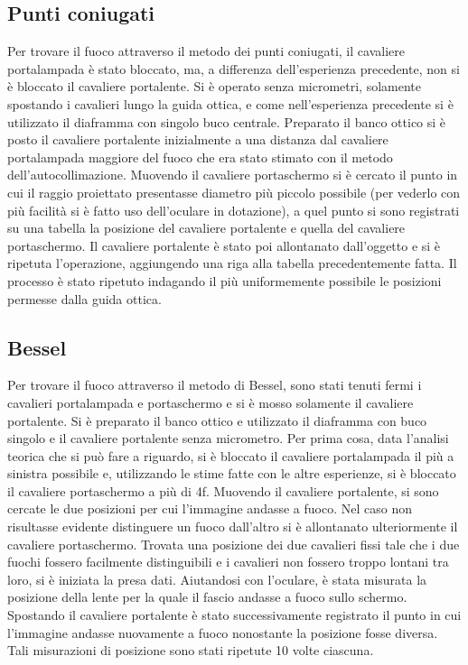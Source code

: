 \subsection{Punti coniugati} 
Per trovare il fuoco attraverso il metodo dei punti coniugati, il 
cavaliere portalampada \`e stato bloccato, ma, a differenza dell'esperienza 
precedente, non si è bloccato il cavaliere portalente. Si è 
operato senza micrometri, solamente spostando i cavalieri lungo la 
guida ottica, e come nell'esperienza precedente si è utilizzato il 
diaframma con singolo buco centrale. Preparato il banco ottico si è 
posto il cavaliere portalente inizialmente a una distanza dal 
cavaliere portalampada maggiore del fuoco che era stato stimato con 
il metodo dell'autocollimazione. Muovendo il cavaliere portaschermo 
si è cercato il punto in cui il raggio proiettato presentasse 
diametro più piccolo possibile (per vederlo con più facilità si è 
fatto uso dell'oculare in dotazione), a quel punto si sono 
registrati su una tabella la posizione del cavaliere portalente e 
quella del cavaliere portaschermo. Il cavaliere portalente è stato 
poi allontanato dall'oggetto e si è ripetuta l'operazione, aggiungendo una 
riga alla tabella precedentemente fatta. Il processo è stato 
ripetuto indagando il più uniformemente possibile le posizioni 
permesse dalla guida ottica.

\subsection{Bessel}
Per trovare il fuoco attraverso il metodo di Bessel, sono stati 
tenuti fermi i cavalieri portalampada e portaschermo e si è 
mosso solamente il cavaliere portalente. Si è preparato il banco 
ottico e utilizzato il diaframma con buco singolo e il cavaliere 
portalente senza micrometro. Per prima cosa, data l'analisi teorica 
che si può fare a riguardo, si è bloccato il cavaliere portalampada 
il più a sinistra possibile e, 
utilizzando le stime fatte con le altre esperienze, si è bloccato il 
cavaliere portaschermo a più di 4f. Muovendo il cavaliere 
portalente, si sono cercate le due posizioni per cui l'immagine 
andasse a fuoco. Nel caso non risultasse evidente distinguere un 
fuoco dall'altro si è allontanato ulteriormente il cavaliere 
portaschermo. Trovata una posizione dei due cavalieri fissi tale che 
i due fuochi fossero facilmente distinguibili e i cavalieri non 
fossero troppo lontani tra loro, si è iniziata la presa dati. 
Aiutandosi con l'oculare, è stata misurata la posizione della lente 
per la quale il fascio andasse a fuoco sullo schermo. Spostando il 
cavaliere portalente è stato successivamente registrato il punto 
in cui l'immagine andasse nuovamente a fuoco nonostante la posizione 
fosse diversa. Tali misurazioni di posizione sono stati ripetute 10 
volte ciascuna.

